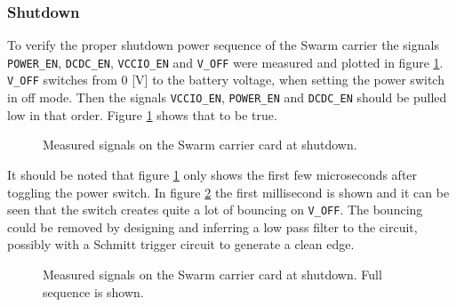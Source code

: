 \subsubsection*{Shutdown}
To verify the proper shutdown power sequence of the Swarm carrier the signals \texttt{POWER\_EN}, \texttt{DCDC\_EN}, \texttt{VCCIO\_EN} and \texttt{V\_OFF} were measured and plotted in figure \ref{fig:shutdown}.
\texttt{V\_OFF} switches from 0 [V] to the battery voltage, when setting the power switch in off mode.
Then the signals \texttt{VCCIO\_EN}, \texttt{POWER\_EN} and \texttt{DCDC\_EN} should be pulled low in that order.
Figure \ref{fig:shutdown} shows that to be true.


\begin{figure}[h]
	\centering
    
	\caption{Measured signals on the Swarm carrier card at shutdown.}
	\label{fig:shutdown}
\end{figure}
It should be noted that figure \ref{fig:shutdown} only shows the first few microseconds after toggling the power switch.
In figure \ref{fig:shutdown_bounce} the first millisecond is shown and it can be seen that the switch creates quite a lot of bouncing on \texttt{V\_OFF}.
The bouncing could be removed by designing and inferring a low pass filter to the circuit, possibly with a Schmitt trigger circuit to generate a clean edge.

\begin{figure}[h]
	\centering
    
	\caption{Measured signals on the Swarm carrier card at shutdown. Full sequence is shown.}
	\label{fig:shutdown_bounce}
\end{figure}

